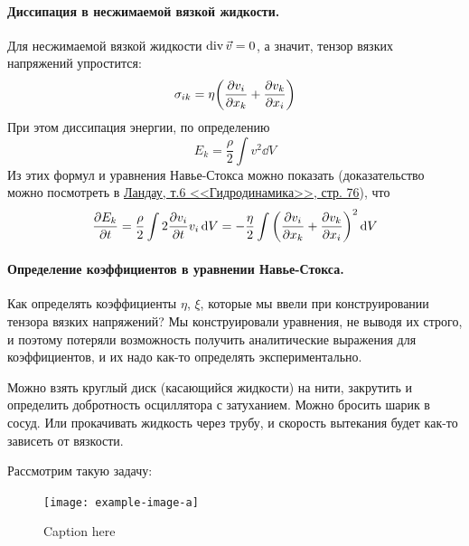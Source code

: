 \paragraph{Диссипация в несжимаемой вязкой жидкости.} Для несжимаемой вязкой жидкости $\operatorname{div} \vec{v}=0$, а значит, тензор вязких напряжений упростится:
\begin{equation}
	 \sigma_{ik} = \eta\qty(\pdv{v_i}{x_k}+\pdv{v_k}{x_i})
\end{equation}
При этом диссипация энергии, по определению
\begin{equation}
	E_k = \frac{\rho}{2}\int v^2 \dd{V}
\end{equation}
Из этих формул и уравнения Навье-Стокса можно показать (доказательство можно посмотреть в \href{http://www.immsp.kiev.ua/postgraduate/Biblioteka_trudy/GidrodinamikaLanday1986.pdf#page=76}{Ландау, т.6 <<Гидродинамика>>, стр. 76}), что 
\begin{equation}
    \pdv{E_k}{t} = \frac{\rho}{2} \int 2\pdv{v_i}{t} v_i \dd{V}=
    -\frac{\eta}{2} \int   \qty(\pdv{v_i}{x_k}+\pdv{v_k}{x_i})^2 \dd{V}
\end{equation}

\paragraph{Определение коэффициентов в уравнении Навье-Стокса.} Как определять коэффициенты $\eta$, $\xi$, которые мы ввели при конструировании тензора вязких напряжений? Мы конструировали уравнения, не выводя их строго, и поэтому потеряли возможность получить аналитические выражения для коэффициентов, и их надо как-то определять экспериментально.

Можно взять круглый диск (касающийся жидкости) на нити, закрутить и определить добротность осциллятора с затуханием. Можно бросить шарик в сосуд. Или прокачивать жидкость через трубу, и скорость вытекания будет как-то зависеть от вязкости.

Рассмотрим такую задачу:

\begin{figure}[h!]
    \centering
    \texttt{[image: example-image-a]}
    \caption{Caption here}
    \label{fig:figure1}
\end{figure}

